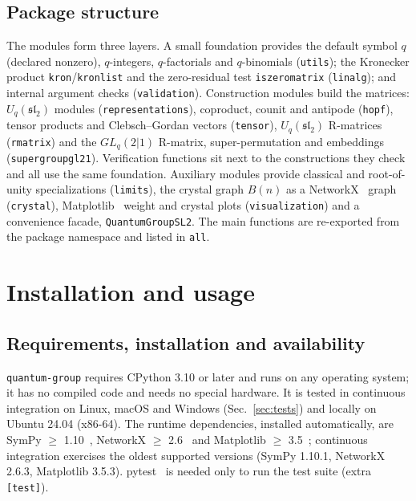 \documentclass{SciPost}
\newcommand{\pkg}{\texttt{quantum-group}}
\newcommand{\code}[1]{\texttt{\begingroup\def\_{\textunderscore\allowbreak}#1\endgroup}}
\newcommand{\Uq}{U_q(\mathfrak{sl}_2)}
\newcommand{\GL}{GL_q(2|1)}
\begin{document}
\subsection{Package structure}

The modules form three layers. A small foundation provides the default symbol $q$ (declared nonzero), $q$-integers, $q$-factorials and $q$-binomials (\code{utils}); the Kronecker product \code{kron}/\code{kron\_list} and the zero-residual test \code{is\_zero\_matrix} (\code{linalg}); and internal argument checks (\code{\_validation}). Construction modules build the matrices: $\Uq$ modules (\code{representations}), coproduct, counit and antipode (\code{hopf}), tensor products and Clebsch--Gordan vectors (\code{tensor}), $\Uq$ R-matrices (\code{r\_matrix}) and the $\GL$ R-matrix, super-permutation and embeddings (\code{supergroup\_gl21}). Verification functions sit next to the constructions they check and all use the same foundation. Auxiliary modules provide classical and root-of-unity specializations (\code{limits}), the crystal graph $B(n)$ as a NetworkX~\cite{hagberg2008networkx} graph (\code{crystal}), Matplotlib~\cite{hunter2007matplotlib} weight and crystal plots (\code{visualization}) and a convenience facade, \code{QuantumGroupSL2}. The main functions are re-exported from the package namespace and listed in \code{\_\_all\_\_}.


\section{Installation and usage}
\label{sec:usage}

\subsection{Requirements, installation and availability}
\label{sec:install}

\pkg{} requires CPython 3.10 or later and runs on any operating system; it has no compiled code and needs no special hardware. It is tested in continuous integration on Linux, macOS and Windows (Sec.~\ref{sec:tests}) and locally on Ubuntu 24.04 (x86-64). The runtime dependencies, installed automatically, are SymPy $\geq$ 1.10~\cite{meurer2017sympy}, NetworkX $\geq$ 2.6~\cite{hagberg2008networkx} and Matplotlib $\geq$ 3.5~\cite{hunter2007matplotlib}; continuous integration exercises the oldest supported versions (SymPy 1.10.1, NetworkX 2.6.3, Matplotlib 3.5.3). pytest~\cite{pytest} is needed only to run the test suite (extra \code{[test]}).
\end{document}
